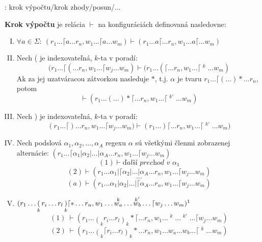 \TODO: krok výpočtu/krok zhody/posun/...
\begin{df}
\textbf{Krok výpočtu} je relácia $\vdash$ na konfiguráciách definovaná nasledovne:

\begin{enumerate}[I.]
\item $\forall a \in \Sigma: ~(r_1 \dots \lceil a \dots r_n, w_1 \dots \lceil a \dots w_m) \vdash (r_1 \dots a\lceil \dots r_n, w_1 \dots a \lceil \dots w_m)$
\item Nech ( je indexovateľná, $k$-ta v poradí: $$ (r_1 \dots \lceil ( \dots r_n, w_1 \dots \lceil w_j \dots w_m) \vdash (r_1 \dots (\lceil \dots r_n, w_1 \dots \lceil \mathop{w_j}^k \dots w_m)$$
Ak za jej uzatváracou zátvorkou nasleduje $*$, t.j. $\alpha$ je tvaru $r_1 \dots \lceil ( \dots ) * \dots r_n$, potom $$ \vdash (r_1 \dots (\dots )* \lceil \dots r_n, w_1 \dots \lceil \mathop{\mathop{w_j}^k}^{k'} \dots w_m ) $$
\item Nech ) je indexovateľná, $k$-ta v poradí: $$ (r_1 \dots \lceil ) \dots r_n, w_1 \dots \lceil w_j \dots w_m) \vdash (r_1 \dots )\lceil \dots r_n, w_1 \dots \lceil \mathop{w_j}^{k'} \dots w_m)$$
\item Nech podslová $\alpha_1, \alpha_2,\dots,\alpha_A$ regexu $\alpha$ sú všetkými členmi zobrazenej alternácie: $(r_1 \dots \lceil \alpha_1 | \alpha_2 | \dots | \alpha_A \dots r_n, w_1\dots \lceil w_j \dots w_m)$
$$(1) \vdash \textit{ďalší prechod v }\alpha_1$$
$$(2) \vdash (r_1 \dots \alpha_1 | \lceil \alpha_2 | \dots | \alpha_A \dots r_n, w_1\dots \lceil w_j \dots w_m)$$
$$\dots$$
$$(a) \vdash (r_1 \dots \alpha_1 | \alpha_2 | \dots | \lceil \alpha_A \dots r_n, w_1\dots \lceil w_j \dots w_m)$$
\item $\displaystyle{(r_1 \dots \mathop{(}_kr_i \dots r_l\mathop{)}_k\lceil * \dots r_n, w_1 \dots \mathop{w_a}^k \dots \mathop{w_b}^{k'} \dots \lceil w_j \dots w_m)\footnotemark}$
$$(1) ~\vdash(r_1 \dots \mathop{(}_kr_i \dots r_l\mathop{)}_k *\lceil \dots r_n, w_1 \dots \mathop{w_a}^k \dots \mathop{w_b}^{k'} \dots \lceil w_j \dots w_m)$$
$$(2) ~\vdash(r_1 \dots \mathop{(}_k\lceil r_i \dots r_l\mathop{)}_k * \dots r_n, w_1 \dots w_a \dots w_b \dots \lceil \mathop{w_j}^k \dots w_m)$$

\end{enumerate}
\end{df}
